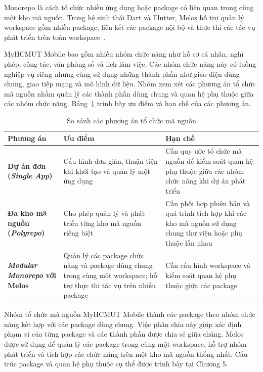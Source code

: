 Monorepo là cách tổ chức nhiều ứng dụng hoặc package có liên quan trong cùng một kho mã nguồn. Trong hệ sinh thái Dart và Flutter, Melos hỗ trợ quản lý workspace gồm nhiều package, liên kết các package nội bộ và thực thi các tác vụ phát triển trên toàn workspace~\cite{melos_doc}.

MyHCMUT Mobile bao gồm nhiều nhóm chức năng như hồ sơ cá nhân, nghỉ phép, công tác, văn phòng số và lịch làm việc. Các nhóm chức năng này có luồng nghiệp vụ riêng nhưng cùng sử dụng những thành phần như giao diện dùng chung, giao tiếp mạng và mô hình dữ liệu. Nhóm xem xét các phương án tổ chức mã nguồn nhằm quản lý các thành phần dùng chung và quan hệ phụ thuộc giữa các nhóm chức năng. Bảng~\ref{tab:compare_melos} trình bày ưu điểm và hạn chế của các phương án.

\begin{table}[H]
\centering
\small
\caption{So sánh các phương án tổ chức mã nguồn}
\label{tab:compare_melos}
\begin{tabularx}{\textwidth}{|>{\raggedright\arraybackslash\bfseries}p{3cm}|>{\raggedright\arraybackslash}X|>{\raggedright\arraybackslash}X|}
\hline
\textbf{Phương án} & \textbf{Ưu điểm} & \textbf{Hạn chế} \\
\hline
Dự án đơn (\textit{Single App}) & Cấu hình đơn giản, thuận tiện khi khởi tạo và quản lý một ứng dụng & Cần quy ước tổ chức mã nguồn để kiểm soát quan hệ phụ thuộc giữa các nhóm chức năng khi dự án phát triển \\
\hline
Đa kho mã nguồn (\textit{Polyrepo}) & Cho phép quản lý và phát triển từng kho mã nguồn riêng biệt & Cần phối hợp phiên bản và quá trình tích hợp khi các kho mã nguồn sử dụng chung thư viện hoặc phụ thuộc lẫn nhau \\
\hline
\textit{Modular Monorepo} với Melos & Quản lý các package chức năng và package dùng chung trong cùng một workspace; hỗ trợ thực thi tác vụ trên nhiều package & Cần cấu hình workspace và kiểm soát quan hệ phụ thuộc giữa các package \\
\hline
\end{tabularx}
\end{table}

Nhóm tổ chức mã nguồn MyHCMUT Mobile thành các package theo nhóm chức năng kết hợp với các package dùng chung. Việc phân chia này giúp xác định phạm vi của từng package và các thành phần được chia sẻ giữa chúng. Melos được sử dụng để quản lý các package trong cùng một workspace, hỗ trợ nhóm phát triển và tích hợp các chức năng trên một kho mã nguồn thống nhất. Cấu trúc package và quan hệ phụ thuộc cụ thể được trình bày tại Chương 5.


